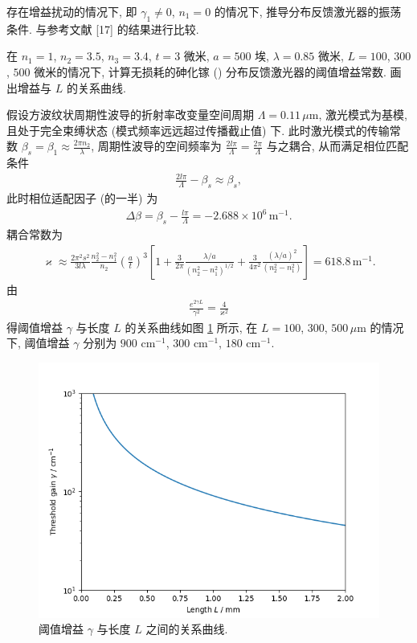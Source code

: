 \documentclass{note}
\begin{document}
\begin{exe}
    存在增益扰动的情况下, 即 $\gamma_1\neq 0$, $n_1=0$ 的情况下, 推导分布反馈激光器的振荡条件. 与参考文献 [17] 的结果进行比较.
\end{exe}
\begin{sol}
    
\end{sol}

\begin{exe}
    在 $n_1=1$, $n_2=3.5$, $n_3=3.4$, $t=3$ 微米, $a=500$ 埃, $\lambda=0.85$ 微米, $L=100$, $300$, $500$ 微米的情况下, 计算无损耗的砷化镓 () 分布反馈激光器的阈值增益常数. 画出增益与 $L$ 的关系曲线.
\end{exe}
\begin{sol}
    假设方波纹状周期性波导的折射率改变量空间周期 $\Lambda=0.11\,\mu$m, 激光模式为基模, 且处于完全束缚状态 (模式频率远远超过传播截止值) 下.
    此时激光模式的传输常数 $\beta_s=\beta_1\approx\frac{2\pi n_2}{\lambda}$, 周期性波导的空间频率为 $\frac{2l\pi}{\Lambda}=\frac{2\pi}{\Lambda}$ 与之耦合, 从而满足相位匹配条件
    \begin{align}
        \frac{2l\pi}{\Lambda}-\beta_s\approx\beta_s,
    \end{align}
    此时相位适配因子 (的一半) 为
    \begin{align}
        \Delta\beta=\beta_s-\frac{l\pi}{\Lambda}=-2.688\times 10^6\,\text{m}^{-1}.
    \end{align}
    耦合常数为
    \begin{align}
        \varkappa\approx\frac{2\pi^2s^2}{3l\lambda}\frac{n_2^2-n_1^2}{n_2}\left(\frac{a}{t}\right)^3\left[1+\frac{3}{2\pi}\frac{\lambda/a}{(n_2^2-n_1^2)^{1/2}}+\frac{3}{4\pi^2}\frac{(\lambda/a)^2}{(n_2^2-n_1^2)}\right]=618.8\,\text{m}^{-1}.
    \end{align}
    由
    \begin{align}
        \frac{e^{2\gamma L}}{\gamma^2}=\frac{4}{\varkappa^2}
    \end{align}
    得阈值增益 $\gamma$ 与长度 $L$ 的关系曲线如图 \ref{19.7-fig} 所示, 在 $L=100$, $300$, $500\,\mu$m 的情况下, 阈值增益 $\gamma$ 分别为 $900$ cm$^{-1}$, $300$ cm$^{-1}$, $180$ cm$^{-1}$.
    \begin{figure}[H]
        \centering
        \includegraphics[width=.5\columnwidth]{Figures/19.7.png}
        \caption{阈值增益 $\gamma$ 与长度 $L$ 之间的关系曲线.}
        \label{19.7-fig}
    \end{figure}
\end{sol}
\end{document}
